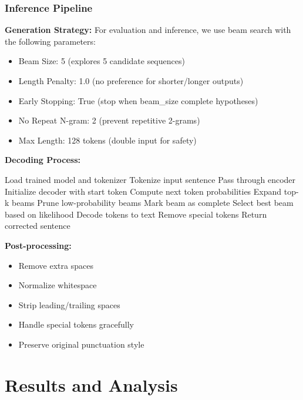 \documentclass[12pt,a4paper]{article}
\begin{document}
\subsubsection{Inference Pipeline}

\textbf{Generation Strategy:}
For evaluation and inference, we use beam search with the following parameters:
\begin{itemize}
    \item Beam Size: 5 (explores 5 candidate sequences)
    \item Length Penalty: 1.0 (no preference for shorter/longer outputs)
    \item Early Stopping: True (stop when beam\_size complete hypotheses)
    \item No Repeat N-gram: 2 (prevent repetitive 2-grams)
    \item Max Length: 128 tokens (double input for safety)
\end{itemize}

\textbf{Decoding Process:}
\begin{algorithmic}[1]
\STATE Load trained model and tokenizer
\STATE Tokenize input sentence
\STATE Pass through encoder
\STATE Initialize decoder with start token
    \STATE Compute next token probabilities
    \STATE Expand top-k beams
    \STATE Prune low-probability beams
        \STATE Mark beam as complete
    \ENDIF
\ENDFOR
\STATE Select best beam based on likelihood
\STATE Decode tokens to text
\STATE Remove special tokens
\STATE Return corrected sentence
\end{algorithmic}

\textbf{Post-processing:}
\begin{itemize}
    \item Remove extra spaces
    \item Normalize whitespace
    \item Strip leading/trailing spaces
    \item Handle special tokens gracefully
    \item Preserve original punctuation style
\end{itemize}

\newpage

\section{Results and Analysis}
\end{document}
